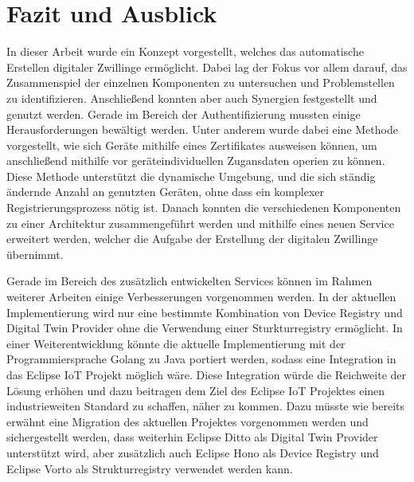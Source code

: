 \documentclass[
	12pt,
	BCOR=5mm,
	DIV=12,
	headinclude=on,
	footinclude=off,
	parskip=half,
	bibliography=totoc,
	listof=entryprefix,
	toc=listof,
	numbers=noenddot,
	plainfootsepline
]{scrreprt}
\begin{document}




\chapter{Fazit und Ausblick}

In dieser Arbeit wurde ein Konzept vorgestellt, welches das automatische Erstellen digitaler Zwillinge ermöglicht. Dabei lag der Fokus vor allem darauf, das Zusammenspiel der einzelnen Komponenten zu untersuchen und Problemstellen zu identifizieren. Anschließend konnten aber auch Synergien festgestellt und genutzt werden. Gerade im Bereich der Authentifizierung mussten einige Herausforderungen bewältigt werden. Unter anderem wurde dabei eine Methode vorgestellt, wie sich Geräte mithilfe eines Zertifikates ausweisen können, um anschließend mithilfe vor geräteindividuellen Zugansdaten operien zu können. Diese Methode unterstützt die dynamische Umgebung, und die sich ständig ändernde Anzahl an genutzten Geräten, ohne dass ein komplexer Registrierungsprozess nötig ist. Danach konnten die verschiedenen Komponenten zu einer Architektur zusammengeführt werden und mithilfe eines neuen Service erweitert werden, welcher die Aufgabe der Erstellung der digitalen Zwillinge übernimmt. 

Gerade im Bereich des zusätzlich entwickelten Services können im Rahmen weiterer Arbeiten einige Verbesserungen vorgenommen werden. In der aktuellen Implementierung wird nur eine bestimmte Kombination von Device Registry und Digital Twin Provider ohne die Verwendung einer Sturkturregistry ermöglicht. In einer Weiterentwicklung könnte die aktuelle Implementierung mit der Programmiersprache Golang zu Java portiert werden, sodass eine Integration in das Eclipse IoT Projekt möglich wäre. Diese Integration würde die Reichweite der Lösung erhöhen und dazu beitragen dem Ziel des Eclipse IoT Projektes einen industrieweiten Standard zu schaffen, näher zu kommen. Dazu müsste wie bereits erwähnt eine Migration des aktuellen Projektes vorgenommen werden und sichergestellt werden, dass weiterhin Eclipse Ditto als Digital Twin Provider unterstützt wird, aber zusätzlich auch Eclipse Hono als Device Registry und Eclipse Vorto als Strukturregistry verwendet werden kann. 
\end{document}
